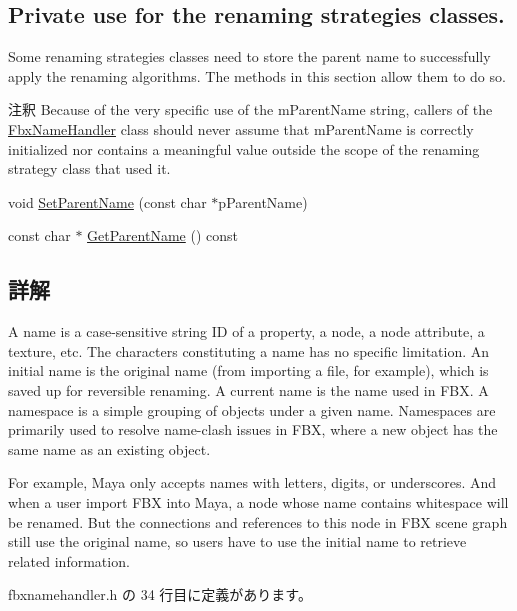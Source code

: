 \subsection*{Private use for the renaming strategies classes.}
\label{_amgrp8fe6d105820914a0c89a4b0c422a569e}%
Some renaming strategies classes need to store the parent name to successfully apply the renaming algorithms. The methods in this section allow them to do so. \begin{DoxyRemark}{注釈}
Because of the very specific use of the m\+Parent\+Name string, callers of the \hyperlink{class_fbx_name_handler}{Fbx\+Name\+Handler} class should never assume that m\+Parent\+Name is correctly initialized nor contains a meaningful value outside the scope of the renaming strategy class that used it. 
\end{DoxyRemark}
\begin{DoxyCompactItemize}
\item 
void \hyperlink{class_fbx_name_handler_a647b1b11442049cebf1e958fcc523608}{Set\+Parent\+Name} (const char $\ast$p\+Parent\+Name)
\item 
const char $\ast$ \hyperlink{class_fbx_name_handler_a81b581d71cce2bc20c51ae16a95a8545}{Get\+Parent\+Name} () const
\end{DoxyCompactItemize}


\subsection{詳解}
A name is a case-\/sensitive string ID of a property, a node, a node attribute, a texture, etc. The characters constituting a name has no specific limitation. An initial name is the original name (from importing a file, for example), which is saved up for reversible renaming. A current name is the name used in F\+BX. A namespace is a simple grouping of objects under a given name. Namespaces are primarily used to resolve name-\/clash issues in F\+BX, where a new object has the same name as an existing object.

For example, Maya only accepts names with letters, digits, or underscores. And when a user import F\+BX into Maya, a node whose name contains whitespace will be renamed. But the connections and references to this node in F\+BX scene graph still use the original name, so users have to use the initial name to retrieve related information. 

 fbxnamehandler.\+h の 34 行目に定義があります。



